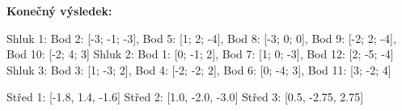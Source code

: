 \documentclass[12pt]{article}
\begin{document}
\vspace{0.5cm}

\textbf{Konečný výsledek:}

\vspace{0.25cm}

Shluk 1: Bod 2: [-3; -1; -3], Bod 5: [1; 2; -4], Bod 8: [-3; 0; 0], Bod 9: [-2; 2; -4], \newline 
\null\quad\quad\qquad   Bod 10: [-2; 4; 3] \newline
Shluk 2: Bod 1: [0; -1; 2], Bod 7: [1; 0; -3], Bod 12: [2; -5; -4] \newline
Shluk 3: Bod 3: [1; -3; 2], Bod 4: [-2; -2; 2], Bod 6: [0; -4; 3], Bod 11: [3; -2; 4]

\vspace{0.2cm}

Střed 1: [-1.8, 1.4, -1.6] \newline
Střed 2: [1.0, -2.0, -3.0] \newline
Střed 3: [0.5, -2.75, 2.75] \newline
\end{document}
